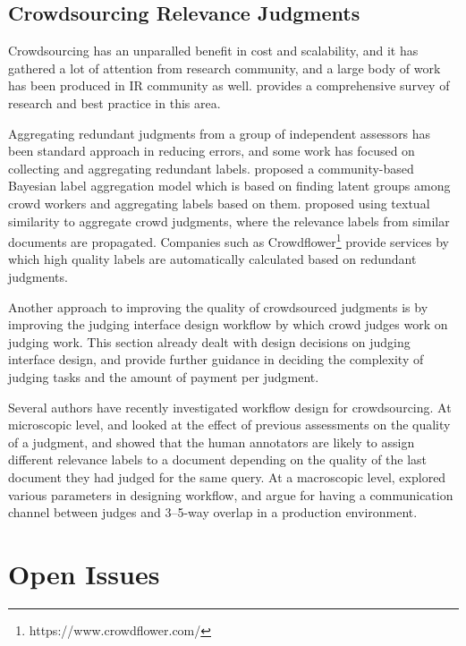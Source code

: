 \subsection{Crowdsourcing Relevance Judgments}
\label{s-crowdsourcing}

Crowdsourcing has an unparalled benefit in cost and scalability, and it has gathered a lot of attention from research community, and a large body of work has been produced in IR community as well. \cite{Alonso2012} provides a comprehensive survey of research and best practice in this area. 

Aggregating redundant judgments from a group of independent assessors has been standard approach in reducing errors, and some work has focused on collecting and aggregating redundant labels. \cite{Venanzi:2014} proposed a community-based Bayesian label aggregation model which is based on finding latent groups among crowd workers and aggregating labels based on them. \cite{Davtyan2015} proposed using textual similarity to aggregate crowd judgments, where the relevance labels from similar documents are propagated. Companies such as Crowdflower\footnote{https://www.crowdflower.com/} provide services by which high quality labels are automatically calculated based on redundant judgments.

Another approach to improving the quality of crowdsourced judgments is by improving the judging interface design workflow by which crowd judges work on judging work. This section already dealt with design decisions on judging interface design, and \cite{Kazai2012} provide further guidance in deciding the complexity of judging tasks and the amount of payment per judgment.

Several authors have recently investigated workflow design for crowdsourcing. At microscopic level, \cite{Shokouhi:2015} and \cite{Scholer:2013} looked at the effect of previous assessments on the quality of a judgment, and showed that the human annotators are likely to assign different relevance labels to a document depending on the quality of the last document they had judged for the same query. At a macroscopic level, \cite{Megorskaya2015} explored various parameters in designing workflow, and argue for having a communication channel between judges and 3--5-way overlap in a production environment.

\section{Open Issues}

